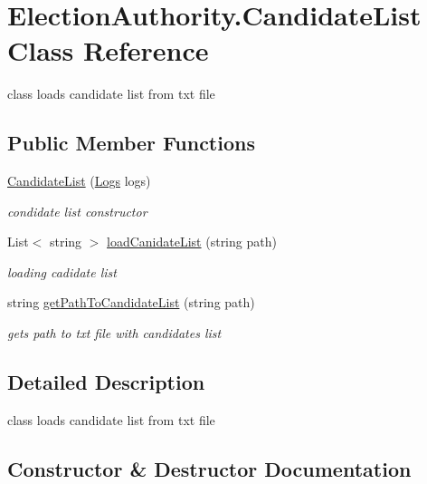 \hypertarget{class_election_authority_1_1_candidate_list}{}\section{Election\+Authority.\+Candidate\+List Class Reference}
\label{class_election_authority_1_1_candidate_list}


class loads candidate list from txt file  


\subsection*{Public Member Functions}
\begin{DoxyCompactItemize}
\item 
\hyperlink{class_election_authority_1_1_candidate_list_abd9114612080354d3b549e988421d53f}{Candidate\+List} (\hyperlink{class_election_authority_1_1_logs}{Logs} logs)
\begin{DoxyCompactList}\small\item\em condidate list constructor \end{DoxyCompactList}\item 
List$<$ string $>$ \hyperlink{class_election_authority_1_1_candidate_list_ad4bbc38420fb19a72842a8f3741a3800}{load\+Canidate\+List} (string path)
\begin{DoxyCompactList}\small\item\em loading cadidate list \end{DoxyCompactList}\item 
string \hyperlink{class_election_authority_1_1_candidate_list_a37406221224e2b20f6f76ca774b70a47}{get\+Path\+To\+Candidate\+List} (string path)
\begin{DoxyCompactList}\small\item\em gets path to txt file with candidates list \end{DoxyCompactList}\end{DoxyCompactItemize}


\subsection{Detailed Description}
class loads candidate list from txt file 



\subsection{Constructor \& Destructor Documentation}
\hypertarget{class_election_authority_1_1_candidate_list_abd9114612080354d3b549e988421d53f}{}
